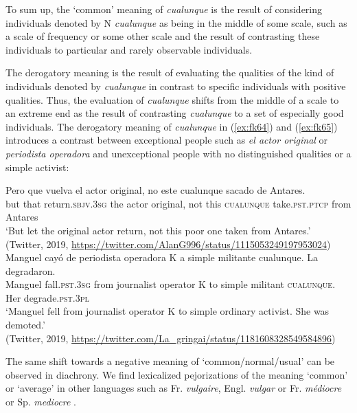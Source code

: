 \documentclass[output=paper,colorlinks,citecolor=brown]{langscibook}
\begin{document}
To sum up, the ‘common’ meaning of \textit{cualunque} is the result of considering individuals denoted by N \textit{cualunque} as being in the middle of some scale, such as a scale of frequency or some other scale and the result of contrasting these individuals to particular and rarely observable individuals.

The derogatory meaning is the result of evaluating the qualities of the kind of individuals denoted by \textit{cualunque} in contrast to specific individuals with positive qualities. Thus, the evaluation of \textit{cualunque} shifts from the middle of a scale to an extreme end as the result of contrasting \textit{cualunque} to a set of especially good individuals. The derogatory meaning of \textit{cualunque} in (\ref{ex:fk64}) and (\ref{ex:fk65}) introduces a contrast between exceptional people such as \textit{el actor original} or \textit{periodista operadora} and unexceptional people with no distinguished qualities or a simple activist:\largerpage[-1]\pagebreak

\ea \label{ex:fk64}
    \gll Pero que vuelva el actor original, no este cualunque sacado de Antares.\\
    but that return.\textsc{sbjv.3sg} the actor original, not this \textsc{cualunque} take.\textsc{pst.ptcp} from Antares\\
    \glt ‘But let the original actor return, not this poor one taken from Antares.’\\
    (Twitter, 2019, \url{https://twitter.com/AlanG996/status/1115053249197953024})\\
    
    \ex \label{ex:fk65}
    \gll Manguel cayó de periodista operadora K a simple militante cualunque. La degradaron.\\
    Manguel fall.\textsc{pst.3sg} from journalist operator K to simple militant \textsc{cualunque}. Her degrade.\textsc{pst.3pl}\\
    \glt ‘Manguel fell from journalist operator K to simple ordinary activist. She was demoted.’\\
    (Twitter, 2019, \url{https://twitter.com/La_gringai/status/1181608328549584896})\\
\z

The same shift towards a negative meaning of ‘common/normal/usual’ can be observed in diachrony. We find lexicalized pejorizations of the meaning ‘common’ or ‘average’ in other languages such as Fr. \textit{vulgaire}, Engl. \textit{vulgar} or Fr. \textit{médiocre} or Sp. \textit{mediocre} \citep[see][43]{KleparskiBorkowska2007}.
\end{document}

